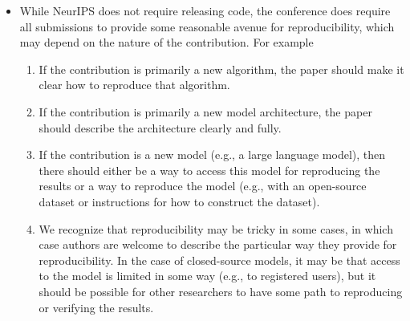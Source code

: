 \documentclass{article}
\begin{document}
\begin{enumerate}
\begin{itemize}
        \item While NeurIPS does not require releasing code, the conference does require all submissions to provide some reasonable avenue for reproducibility, which may depend on the nature of the contribution. For example
        \begin{enumerate}
            \item If the contribution is primarily a new algorithm, the paper should make it clear how to reproduce that algorithm.
            \item If the contribution is primarily a new model architecture, the paper should describe the architecture clearly and fully.
            \item If the contribution is a new model (e.g., a large language model), then there should either be a way to access this model for reproducing the results or a way to reproduce the model (e.g., with an open-source dataset or instructions for how to construct the dataset).
            \item We recognize that reproducibility may be tricky in some cases, in which case authors are welcome to describe the particular way they provide for reproducibility. In the case of closed-source models, it may be that access to the model is limited in some way (e.g., to registered users), but it should be possible for other researchers to have some path to reproducing or verifying the results.
        \end{enumerate}
    \end{itemize}



\end{enumerate}
\end{document}
